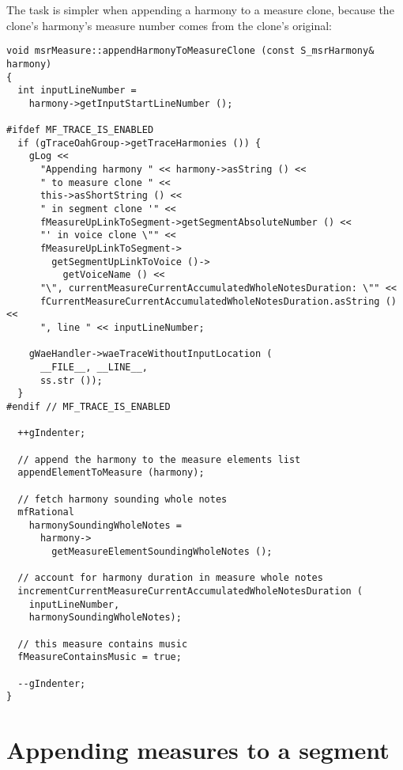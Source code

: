 The task is simpler when appending a harmony to a measure clone, because the clone's harmony's measure number comes from the clone's original:
\begin{lstlisting}[language=CPlusPlus]
void msrMeasure::appendHarmonyToMeasureClone (const S_msrHarmony& harmony)
{
  int inputLineNumber =
    harmony->getInputStartLineNumber ();

#ifdef MF_TRACE_IS_ENABLED
  if (gTraceOahGroup->getTraceHarmonies ()) {
    gLog <<
      "Appending harmony " << harmony->asString () <<
      " to measure clone " <<
      this->asShortString () <<
      " in segment clone '" <<
      fMeasureUpLinkToSegment->getSegmentAbsoluteNumber () <<
      "' in voice clone \"" <<
      fMeasureUpLinkToSegment->
        getSegmentUpLinkToVoice ()->
          getVoiceName () <<
      "\", currentMeasureCurrentAccumulatedWholeNotesDuration: \"" <<
      fCurrentMeasureCurrentAccumulatedWholeNotesDuration.asString () <<
      ", line " << inputLineNumber;

    gWaeHandler->waeTraceWithoutInputLocation (
      __FILE__, __LINE__,
      ss.str ());
  }
#endif // MF_TRACE_IS_ENABLED

  ++gIndenter;

  // append the harmony to the measure elements list
  appendElementToMeasure (harmony);

  // fetch harmony sounding whole notes
  mfRational
    harmonySoundingWholeNotes =
      harmony->
        getMeasureElementSoundingWholeNotes ();

  // account for harmony duration in measure whole notes
  incrementCurrentMeasureCurrentAccumulatedWholeNotesDuration (
    inputLineNumber,
    harmonySoundingWholeNotes);

  // this measure contains music
  fMeasureContainsMusic = true;

  --gIndenter;
}
\end{lstlisting}


\section{Appending measures to a segment}

